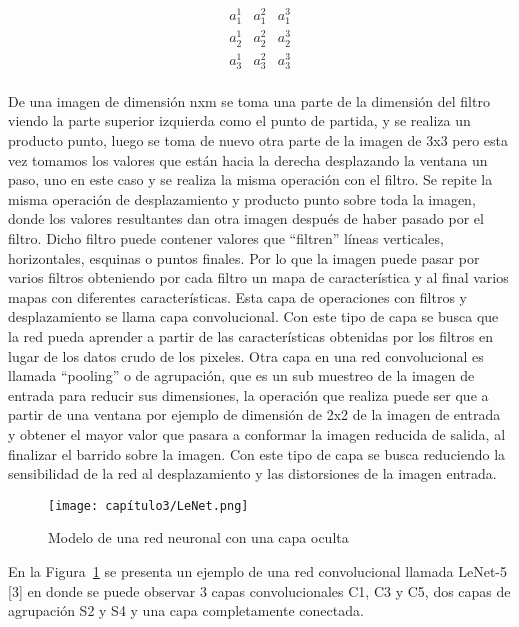 $$\begin{matrix}a_1^1&a_1^2&a_1^3\\a_2^1&a_2^2&a_2^3\\a_3^1&a_3^2&a_3^3\\\end{matrix}$$

De una imagen de dimensión nxm se toma una parte de la dimensión del filtro viendo la parte superior izquierda como el punto de partida, y se realiza un producto punto, luego se toma de nuevo otra parte de la imagen de 3x3 pero esta vez tomamos los valores que están hacia la derecha desplazando la ventana un paso, uno en este caso y se realiza la misma operación con el filtro. Se repite la misma operación de desplazamiento y producto punto sobre toda la imagen, donde los valores resultantes dan otra imagen después de haber pasado por el filtro. Dicho filtro puede contener valores que “filtren” líneas verticales, horizontales, esquinas o puntos finales. Por lo que la imagen puede pasar por varios filtros obteniendo por cada filtro un mapa de característica y al final varios mapas con diferentes características. Esta capa de operaciones con filtros y desplazamiento se llama capa convolucional. Con este tipo de capa se busca que la red pueda aprender a partir de las características obtenidas por los filtros en lugar de los datos crudo de los pixeles.
Otra capa en una red convolucional es llamada “pooling” o de agrupación, que es un sub muestreo de la imagen de entrada para reducir sus dimensiones, la operación que realiza puede ser que a partir de una ventana por ejemplo de dimensión de 2x2 de la imagen de entrada y obtener el mayor valor que pasara a conformar la imagen reducida de salida, al finalizar el barrido sobre la imagen. Con este tipo de capa se busca reduciendo la sensibilidad de la red al desplazamiento y las distorsiones de la imagen entrada.
\begin{figure}[htbp]
\begin{center}
\texttt{[image: capítulo3/LeNet.png]}
\caption{Modelo de una red neuronal con una capa oculta}
\label{fig:lenet}
\end{center}
\end{figure}
En la Figura~\ref{fig:lenet} se presenta un ejemplo de una red convolucional llamada LeNet-5 [3] en donde se puede observar 3 capas convolucionales C1, C3  y C5, dos capas de agrupación S2 y S4 y una capa completamente conectada.

